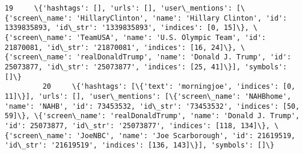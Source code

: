 \documentclass[11pt]{article}
\begin{document}
\begin{Verbatim}[commandchars=\\\{\}]
         19     \{'hashtags': [], 'urls': [], 'user\_mentions': [\{'screen\_name': 'HillaryClinton', 'name': 'Hillary Clinton', 'id': 1339835893, 'id\_str': '1339835893', 'indices': [0, 15]\}, \{'screen\_name': 'TeamUSA', 'name': 'U.S. Olympic Team', 'id': 21870081, 'id\_str': '21870081', 'indices': [16, 24]\}, \{'screen\_name': 'realDonaldTrump', 'name': 'Donald J. Trump', 'id': 25073877, 'id\_str': '25073877', 'indices': [25, 41]\}], 'symbols': []\}                                                                                                                                                                                                                                                                                                                                                                                                                                                                                                                                                                                                                                                                                                                                                                       
         20     \{'hashtags': [\{'text': 'morningjoe', 'indices': [0, 11]\}], 'urls': [], 'user\_mentions': [\{'screen\_name': 'NAHBhome', 'name': 'NAHB', 'id': 73453532, 'id\_str': '73453532', 'indices': [50, 59]\}, \{'screen\_name': 'realDonaldTrump', 'name': 'Donald J. Trump', 'id': 25073877, 'id\_str': '25073877', 'indices': [118, 134]\}, \{'screen\_name': 'JoeNBC', 'name': 'Joe Scarborough', 'id': 21619519, 'id\_str': '21619519', 'indices': [136, 143]\}], 'symbols': []\}                                                                                                                                                                                                                                                                                                                                                                                                                                                                                                                                                                                                                                                                                                                                                

\end{Verbatim}
\end{document}
